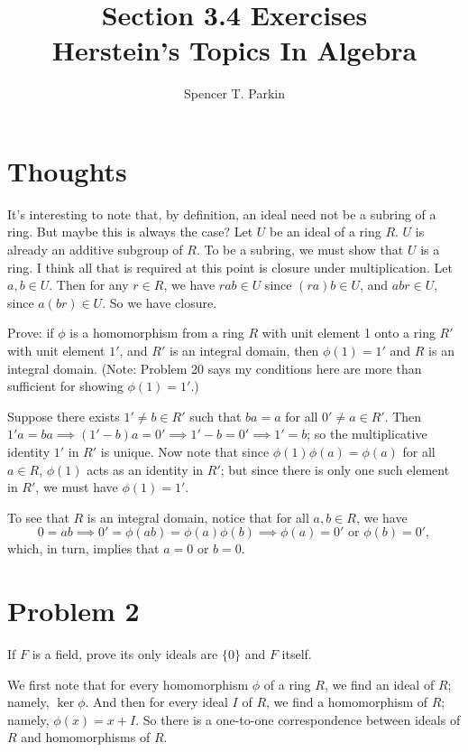 \documentclass[12pt]{article}
\title{Section 3.4 Exercises\\Herstein's Topics In Algebra}
\author{Spencer T. Parkin}
\begin{document}
\maketitle

\section*{Thoughts}

It's interesting to note that, by definition, an ideal need not be a subring of a ring.
But maybe this is always the case?  Let $U$ be an ideal of a ring $R$.
$U$ is already an additive subgroup of $R$.  To be a subring, we must show that $U$ is a ring.
I think all that is required at this point is closure under multiplication.  Let $a,b\in U$.  Then for any $r\in R$,
we have $rab\in U$ since $(ra)b\in U$, and $abr\in U$, since $a(br)\in U$.  So we have closure.

Prove: if $\phi$ is a homomorphism from a ring $R$ with unit element 1 onto a ring $R'$ with
unit element $1'$, and $R'$ is an integral domain, then $\phi(1)=1'$ and $R$ is an integral domain.
(Note: Problem 20 says my conditions here are more than sufficient for showing $\phi(1)=1'$.)

Suppose there exists $1'\neq b\in R'$ such that $ba=a$ for all $0'\neq a\in R'$.
Then $1'a=ba\implies (1'-b)a=0'\implies 1'-b=0'\implies 1'=b$; so the multiplicative
identity $1'$ in $R'$ is unique.  Now note that since $\phi(1)\phi(a)=\phi(a)$ for all
$a\in R$, $\phi(1)$ acts as an identity in $R'$; but since there is only one such element in $R'$,
we must have $\phi(1)=1'$.

To see that $R$ is an integral domain, notice that for all $a,b\in R$, we have
\begin{equation*}
0=ab\implies 0'=\phi(ab)=\phi(a)\phi(b)\implies\mbox{$\phi(a)=0'$ or $\phi(b)=0'$},
\end{equation*}
which, in turn, implies that $a=0$ or $b=0$.

\section*{Problem 2}

If $F$ is a field, prove its only ideals are $\{0\}$ and $F$ itself.

We first note that for every homomorphism $\phi$ of a ring $R$, we find an ideal of $R$; namely, $\ker\phi$.
And then for every ideal $I$ of $R$, we find a homomorphism of $R$; namely, $\phi(x)=x+I$.
So there is a one-to-one correspondence between ideals of $R$ and homomorphisms of $R$.
\end{document}
